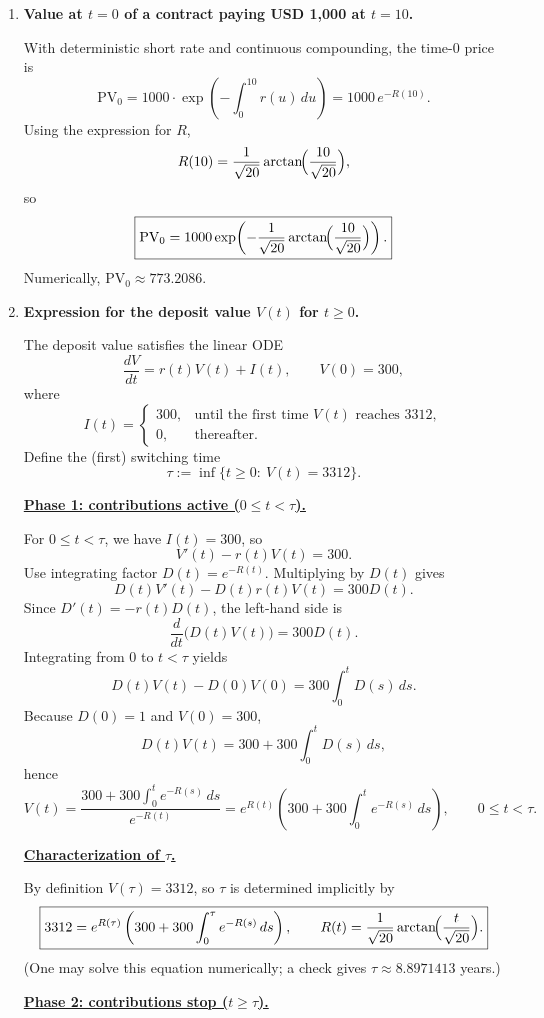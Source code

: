 \documentclass{article}
\begin{document}
\begin{enumerate}
\item[(a)] \textbf{Value at $t=0$ of a contract paying USD 1{,}000 at $t=10$.}

With deterministic short rate and continuous compounding, the time-$0$ price is
\[
\text{PV}_0 = 1000\cdot \exp\!\left(-\int_0^{10} r(u)\,du\right)
=1000\,e^{-R(10)}.
\]
Using the expression for $R$,
\[
R(10)=\frac{1}{\sqrt{20}}\arctan\!\Bigl(\frac{10}{\sqrt{20}}\Bigr),
\]
so
\[
\boxed{
\text{PV}_0
=
1000\exp\!\left(
-\frac{1}{\sqrt{20}}\arctan\!\Bigl(\frac{10}{\sqrt{20}}\Bigr)
\right).
}
\]
Numerically, $\text{PV}_0\approx 773.2086$.  %

\item[(b)] \textbf{Expression for the deposit value $V(t)$ for $t\ge 0$.}

The deposit value satisfies the linear ODE
\[
\frac{dV}{dt}=r(t)V(t)+I(t),\qquad V(0)=300,
\]
where
\[
I(t)=
\begin{cases}
300, & \text{until the first time $V(t)$ reaches }3312,\\
0, & \text{thereafter.}
\end{cases}
\]
Define the (first) switching time
\[
\tau:=\inf\{t\ge 0:\ V(t)=3312\}.
\]

\medskip
\noindent\underline{\textbf{Phase 1: contributions active ($0\le t<\tau$).}}

For $0\le t<\tau$, we have $I(t)=300$, so
\[
V'(t)-r(t)V(t)=300.
\]
Use integrating factor $D(t)=e^{-R(t)}$. Multiplying by $D(t)$ gives
\[
D(t)V'(t)-D(t)r(t)V(t)=300D(t).
\]
Since $D'(t)=-r(t)D(t)$, the left-hand side is
\[
\frac{d}{dt}\bigl(D(t)V(t)\bigr)=300D(t).
\]
Integrating from $0$ to $t<\tau$ yields
\[
D(t)V(t)-D(0)V(0)=300\int_0^t D(s)\,ds.
\]
Because $D(0)=1$ and $V(0)=300$,
\[
D(t)V(t)=300+300\int_0^t D(s)\,ds,
\]
hence
\[
\boxed{
V(t)=\frac{300+300\int_0^t e^{-R(s)}\,ds}{e^{-R(t)}}
=e^{R(t)}\left(300+300\int_0^t e^{-R(s)}\,ds\right),
\qquad 0\le t<\tau.
}
\]

\medskip
\noindent\underline{\textbf{Characterization of $\tau$.}}

By definition $V(\tau)=3312$, so $\tau$ is determined implicitly by
\[
\boxed{
3312=e^{R(\tau)}\left(300+300\int_0^\tau e^{-R(s)}\,ds\right),
\qquad
R(t)=\frac{1}{\sqrt{20}}\arctan\!\Bigl(\frac{t}{\sqrt{20}}\Bigr).
}
\]
(One may solve this equation numerically; a check gives $\tau\approx 8.8971413$ years.)

\medskip
\noindent\underline{\textbf{Phase 2: contributions stop ($t\ge\tau$).}}


\end{enumerate}
\end{document}
